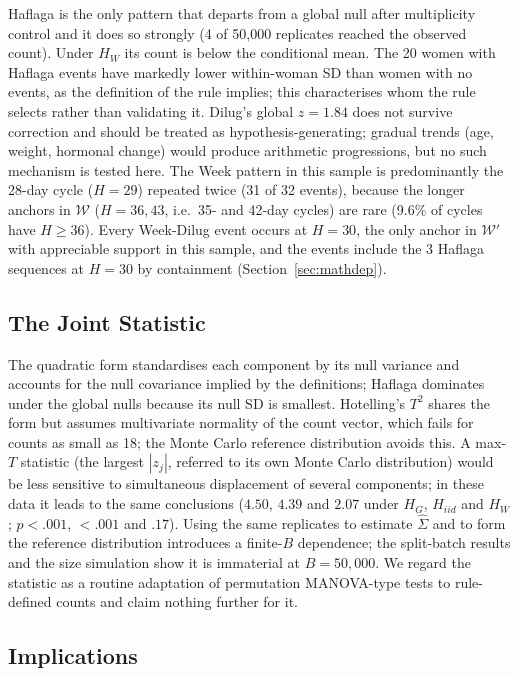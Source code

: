 \documentclass[12pt]{article}
\newcommand{\HG}{H_{G}}
\newcommand{\HI}{H_{iid}}
\newcommand{\HW}{H_{W}}
\begin{document}
Haflaga is the only pattern that departs from a global null after multiplicity control
and it does so strongly (4 of 50,000 replicates reached the observed count). Under $\HW$
its count is below the conditional mean. The 20 women with Haflaga events have markedly
lower within-woman SD than women with no events, as the definition of the rule implies;
this characterises whom the rule selects rather than validating it. Dilug's global
$z = 1.84$ does not survive correction and should be treated as hypothesis-generating;
gradual trends (age, weight, hormonal change) would produce arithmetic progressions,
but no such mechanism is tested here. The Week pattern in this sample is predominantly
the 28-day cycle ($H = 29$) repeated twice (31 of 32 events), because the longer anchors
in $\mathcal{W}$ ($H = 36, 43$, i.e.\ 35- and 42-day cycles) are rare (9.6\% of cycles
have $H \geq 36$). Every Week-Dilug event occurs at $H = 30$, the only anchor in
$\mathcal{W}'$ with appreciable support in this sample, and the events include the 3
Haflaga sequences at $H = 30$ by containment (Section~\ref{sec:mathdep}).

\subsection{The Joint Statistic}

The quadratic form standardises each component by its null variance and accounts for
the null covariance implied by the definitions; Haflaga dominates under the global nulls
because its null SD is smallest. Hotelling's $T^2$ shares the form but assumes
multivariate normality of the count vector, which fails for counts as small as 18; the
Monte Carlo reference distribution avoids this. A max-$T$ statistic (the largest
$|z_j|$, referred to its own Monte Carlo distribution) would be less sensitive to
simultaneous displacement of several components; in these data it leads to the same
conclusions ($4.50$, $4.39$ and $2.07$ under $\HG$, $\HI$ and $\HW$; $p < .001$,
$< .001$ and $.17$). Using the same replicates to estimate $\hat\Sigma$
and to form the reference distribution introduces a finite-$B$ dependence; the
split-batch results and the size simulation show it is immaterial at $B = 50{,}000$. We
regard the statistic as a routine adaptation of permutation MANOVA-type tests
\citep{anderson2001} to rule-defined counts and claim nothing further for it.

\subsection{Implications}
\end{document}
